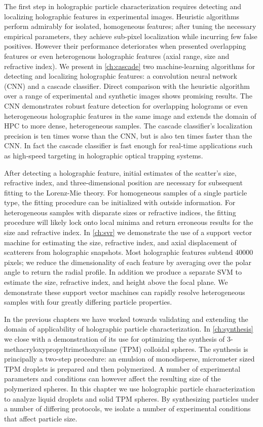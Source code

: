 The first step in holographic particle characterization
requires detecting and localizing holographic features in experimental
images. Heuristic algorithms perform admirably for isolated, homogeneous
features; after tuning the necessary empirical parameters, they achieve
sub-pixel localization while incurring few false positives. However their
performance deteriorates when presented overlapping features or even
heterogenous holographic features (axial range, size and refractive index).
We present in \autoref{ch:cascade} two machine-learning algorithms for
detecting and localizing holographic features: a convolution
neural network (CNN) and a cascade classifier. Direct comparison with the
heuristic algorithm over a range of experimental and synthetic images
shows promising results. The CNN demonstrates robust feature detection
for overlapping holograms or even heterogeneous holographic features
in the same image and extends the domain of HPC to more dense, heterogeneous
samples. The cascade classifier's localization precision
is ten times worse than the CNN, but is also ten times faster than
the CNN. In fact the cascade classifier is fast enough for real-time
applications such as high-speed targeting in holographic optical
trapping systems.

After detecting a holographic feature, initial estimates of the
scatter's size, refractive index, and three-dimensional position
are necessary for subsequent fitting to the Lorenz-Mie theory.
For homogeneous samples of a single particle type, the fitting procedure
can be initialized with outside information. For heterogeneous samples
with disparate sizes or refractive indices, the fitting procedure
will likely lock onto local minima and return erroneous results for
the size and refractive index.
In \autoref{ch:svr} we demonstrate the use of a support vector machine for
estimating the size, refractive index, and axial displacement of scatterers
from holographic snapshots. Most holographic features subtend \SI{40000}{} pixels;
we reduce the dimensionality of each feature by averaging over the polar
angle to return the radial profile. In addition we produce a separate SVM to
estimate the size, refractive index, and height above the focal plane.
We demonstrate these support vector machines can rapidly resolve heterogeneous
samples with four greatly differing particle properties.

In the previous chapters we have worked towards validating and extending
the domain of applicability of holographic particle characterization.
In \autoref{ch:synthesis} we close with a demonstration of its use for
optimizing the synthesis of \num{3}-methacryloxypropyltrimethoxysilane (TPM) colloidal
spheres. The synthesis is principally a two-step procedure: an emulsion of monodisperse,
micrometer sized TPM droplets is prepared and then polymerized.
A number of experimental parameters and conditions can however affect
the resulting size of the polymerized spheres. In this chapter we use
holographic particle characterization to analyze liquid droplets and
solid TPM spheres. By synthesizing particles under a number of
differing protocols, we isolate a number of experimental conditions
that affect particle size.
